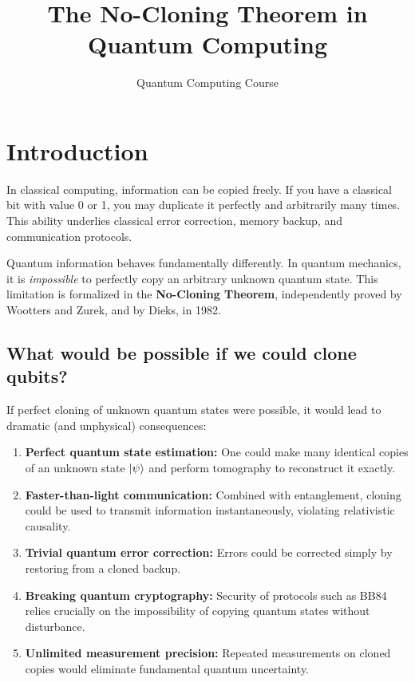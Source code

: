 \documentclass[12pt]{article}
\title{The No-Cloning Theorem in Quantum Computing}
\author{Quantum Computing Course}
\date{}
\begin{document}
\maketitle

\section{Introduction}

In classical computing, information can be copied freely. If you have a classical bit with value 0 or 1, you may duplicate it perfectly and arbitrarily many times. This ability underlies classical error correction, memory backup, and communication protocols.

Quantum information behaves fundamentally differently. In quantum mechanics, it is \emph{impossible} to perfectly copy an arbitrary unknown quantum state. This limitation is formalized in the \textbf{No-Cloning Theorem}, independently proved by Wootters and Zurek, and by Dieks, in 1982.

\subsection{What would be possible if we could clone qubits?}

If perfect cloning of unknown quantum states were possible, it would lead to dramatic (and unphysical) consequences:

\begin{enumerate}
    \item \textbf{Perfect quantum state estimation:} One could make many identical copies of an unknown state $\ket{\psi}$ and perform tomography to reconstruct it exactly.
    
    \item \textbf{Faster-than-light communication:} Combined with entanglement, cloning could be used to transmit information instantaneously, violating relativistic causality.
    
    \item \textbf{Trivial quantum error correction:} Errors could be corrected simply by restoring from a cloned backup.
    
    \item \textbf{Breaking quantum cryptography:} Security of protocols such as BB84 relies crucially on the impossibility of copying quantum states without disturbance.
    
    \item \textbf{Unlimited measurement precision:} Repeated measurements on cloned copies would eliminate fundamental quantum uncertainty.
\end{enumerate}
\end{document}
